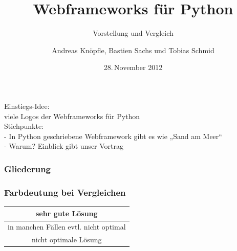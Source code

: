 \documentclass[
    t,
    smaller,
    compress,
]{beamer}
\title{Webframeworks für Python}
\subtitle{Vorstellung und Vergleich}
\author{Andreas Knöpfle, Bastien Sachs und Tobias Schmid}
\institute{Institut für Informatik}
\date{28.\,November 2012}
\begin{document}
{
\begin{frame} %
    \titlepage
\end{frame}
}


\begin{frame}
  Einstiegs-Idee:\\
  viele Logos der Webframeworks für Python\\
  Stichpunkte:\\
   - In Python geschriebene Webframework gibt es wie „Sand am Meer“\\
   - Warum? Einblick gibt unser Vortrag\\
\end{frame}


\begin{frame}
  \frametitle{Gliederung}
  \tableofcontents
\end{frame}

\begin{frame}
	
	\frametitle{Farbdeutung bei Vergleichen}
	
	\begin{table}[h]
		\begin{tabular}{|c|}
			\hline
			 \cellcolor{green} sehr gute Lösung  \\ \hline
		  	\cellcolor{orange} in manchen Fällen evtl. nicht optimal \\ \hline 
		  	\cellcolor{red} nicht optimale Lösung \\ \hline 
		 \end{tabular}
	\end{table}
	
\end{frame}
\end{document}

